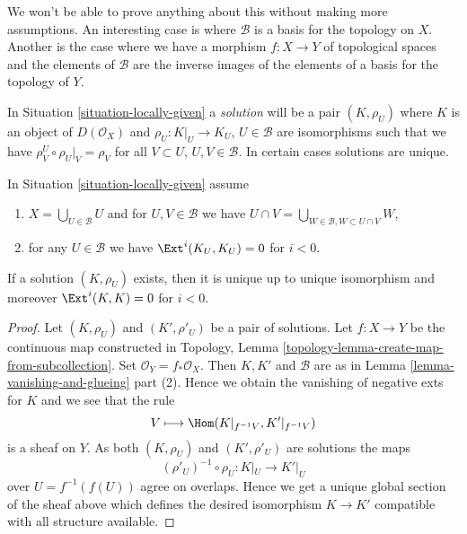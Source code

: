\noindent
We won't be able to prove anything about this without making more
assumptions. An interesting case is where $\mathcal{B}$ is a basis
for the topology on $X$. Another is the case where we have a morphism
$f : X \to Y$ of topological spaces and the elements of $\mathcal{B}$
are the inverse images of the elements of a basis for the topology of $Y$.

\medskip\noindent
In Situation \ref{situation-locally-given} a {\it solution}
will be a pair $(K, \rho_U)$ where $K$ is an object of $D(\mathcal{O}_X)$
and $\rho_U : K|_U \to K_U$, $U \in \mathcal{B}$
are isomorphisms such that
we have $\rho^U_V \circ \rho_U|_V = \rho_V$ for all $V \subset U$,
$U, V \in \mathcal{B}$. In certain cases solutions are unique.

\begin{lemma}
\label{lemma-uniqueness}
In Situation \ref{situation-locally-given} assume
\begin{enumerate}
\item $X = \bigcup_{U \in \mathcal{B}} U$ and
for $U, V \in \mathcal{B}$ we have
$U \cap V = \bigcup_{W \in \mathcal{B}, W \subset U \cap V} W$,
\item for any $U \in \mathcal{B}$ we have $\Ext^i(K_U, K_U) = 0$
for $i < 0$.
\end{enumerate}
If a solution $(K, \rho_U)$ exists, then it is unique up to unique isomorphism
and moreover $\Ext^i(K, K) = 0$ for $i < 0$.
\end{lemma}

\begin{proof}
Let $(K, \rho_U)$ and $(K', \rho'_U)$ be a pair of solutions.
Let $f : X \to Y$ be the continuous map constructed
in Topology, Lemma \ref{topology-lemma-create-map-from-subcollection}.
Set $\mathcal{O}_Y = f_*\mathcal{O}_X$.
Then $K, K'$ and $\mathcal{B}$ are as in
Lemma \ref{lemma-vanishing-and-glueing} part (2).
Hence we obtain the vanishing of negative exts for $K$ and we see that
the rule
$$
V \longmapsto \Hom(K|_{f^{-1}V}, K'|_{f^{-1}V})
$$
is a sheaf on $Y$. As both $(K, \rho_U)$ and $(K', \rho'_U)$ are solutions
the maps
$$
(\rho'_U)^{-1} \circ \rho_U : K|_U \longrightarrow K'|_U
$$
over $U = f^{-1}(f(U))$ agree on overlaps. Hence we get a unique global
section of the sheaf above which defines the desired isomorphism
$K \to K'$ compatible with all structure available.
\end{proof}


